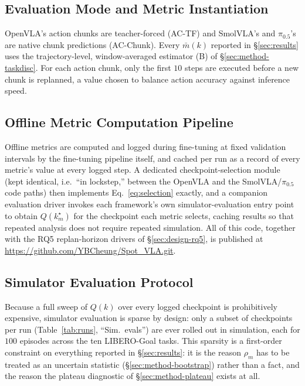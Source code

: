 \documentclass[english,12pt,a4paper,pdftex,elec,utf8]{aaltothesis}
\begin{document}
\subsection{Evaluation Mode and Metric Instantiation}
\label{sec:implementation-mode}

OpenVLA's action chunks are teacher-forced (AC-TF) and SmolVLA's and $\pi_{0.5}$'s are native chunk predictions (AC-Chunk). Every $\bar m(k)$ reported in \S\ref{sec:results} uses the trajectory-level, window-averaged estimator (B) of \S\ref{sec:method-taskdisc}. For each action chunk, only the first $10$ steps are executed before a new chunk is replanned, a value chosen to balance action accuracy against inference speed.

\subsection{Offline Metric Computation Pipeline}
\label{sec:implementation-pipeline}

Offline metrics are computed and logged during fine-tuning at fixed validation intervals by the fine-tuning pipeline itself, and cached per run as a record of every metric's value at every logged step. A dedicated checkpoint-selection module (kept identical, i.e.\ ``in lockstep,'' between the OpenVLA and the SmolVLA/$\pi_{0.5}$ code paths) then implements Eq.~\ref{eq:selection} exactly, and a companion evaluation driver invokes each framework's own simulator-evaluation entry point to obtain $Q(k_m^\star)$ for the checkpoint each metric selects, caching results so that repeated analysis does not require repeated simulation. All of this code, together with the RQ5 replan-horizon drivers of \S\ref{sec:design-rq5}, is published at \url{https://github.com/YBCheung/Spot_VLA.git}.

\subsection{Simulator Evaluation Protocol}
\label{sec:implementation-sim}

Because a full sweep of $Q(k)$ over every logged checkpoint is prohibitively expensive, simulator evaluation is sparse by design: only a subset of checkpoints per run (Table~\ref{tab:runs}, ``Sim.\ evals'') are ever rolled out in simulation, each for $100$ episodes across the ten LIBERO-Goal tasks.
This sparsity is a first-order constraint on everything reported in \S\ref{sec:results}: it is the reason $\rho_m$ has to be treated as an uncertain statistic (\S\ref{sec:method-bootstrap}) rather than a fact, and the reason the plateau diagnostic of \S\ref{sec:method-plateau} exists at all.
\end{document}
